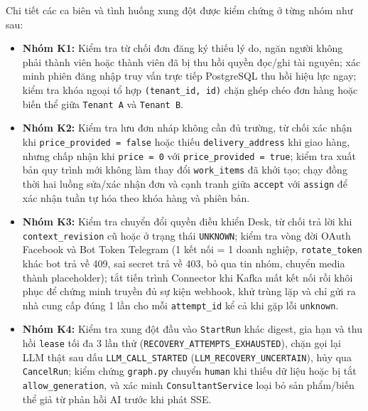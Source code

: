 Chi tiết các ca biên và tình huống xung đột được kiểm chứng ở từng nhóm như sau:
\begin{itemize}
  \item \textbf{Nhóm K1:} Kiểm tra từ chối đơn đăng ký thiếu lý do, ngăn người không phải thành viên hoặc thành viên đã bị thu hồi quyền đọc/ghi tài nguyên;
  xác minh phiên đăng nhập truy vấn trực tiếp PostgreSQL thu hồi hiệu lực ngay; kiểm tra khóa ngoại tổ hợp \texttt{(tenant\_\hspace{0pt}id, id)} chặn ghép chéo đơn hàng hoặc biến thể giữa
  \texttt{Tenant A} và \texttt{Tenant B}.
  \item \textbf{Nhóm K2:} Kiểm tra lưu đơn nháp không cần đủ trường, từ chối xác nhận khi \texttt{price\_\hspace{0pt}provided = false} hoặc thiếu \texttt{delivery\_\hspace{0pt}address} khi giao hàng,
    nhưng chấp nhận khi \texttt{price = 0} với \texttt{price\_\hspace{0pt}provided = true};
  kiểm tra xuất bản quy trình mới không làm thay đổi \texttt{work\_\hspace{0pt}items} đã khởi tạo; chạy đồng thời hai luồng sửa/xác nhận đơn và cạnh tranh giữa \texttt{accept} với
  \texttt{assign} để xác nhận tuần tự hóa theo khóa hàng và phiên bản.
  \item \textbf{Nhóm K3:} Kiểm tra chuyển đổi quyền điều khiển Desk, từ chối trả lời khi \texttt{context\_\hspace{0pt}revision} cũ hoặc ở trạng thái \texttt{UNKNOWN};
  kiểm tra vòng đời OAuth Facebook và Bot Token Telegram (1 kết nối = 1 doanh nghiệp, \texttt{rotate\_\hspace{0pt}token} khác bot trả về 409, sai secret trả về 403, bỏ qua tin nhóm,
  chuyển media thành placeholder);
  tắt tiến trình Connector khi Kafka mất kết nối rồi khôi phục để chứng minh truyền đủ sự kiện webhook, khử trùng lặp và chỉ gửi ra nhà cung cấp đúng 1 lần cho mỗi
  \texttt{attempt\_\hspace{0pt}id} kể cả khi gặp lỗi \texttt{unknown}.
  \item \textbf{Nhóm K4:} Kiểm tra xung đột đầu vào \texttt{StartRun} khác digest, gia hạn và thu hồi \texttt{lease} tối đa 3 lần thử (\texttt{RECOVERY\_\hspace{0pt}ATTEMPTS\_\hspace{0pt}EXHAUSTED}),
    chặn gọi lại LLM thật sau dấu \texttt{LLM\_\hspace{0pt}CALL\_\hspace{0pt}STARTED} (\texttt{LLM\_\hspace{0pt}RECOVERY\_\hspace{0pt}UNCERTAIN}), hủy qua \texttt{CancelRun};
  kiểm chứng \texttt{graph.py} chuyển \texttt{human} khi thiếu dữ liệu hoặc bị tắt \texttt{allow\_\hspace{0pt}generation}, và xác minh \texttt{ConsultantService} loại bỏ sản phẩm/biến thể
  giả từ phản hồi AI trước khi phát SSE.
\end{itemize}

